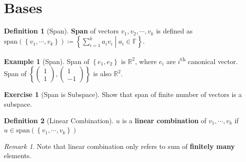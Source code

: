 \documentclass[12pt, a4paper]{article}
\newcommand{\R}{\mathbb{R}}
\newcommand{\spantext}{\text{span}}
\theoremstyle{remark}
\newtheorem{remark}{Remark}
\theoremstyle{definition}
\newtheorem{definition}{Definition}
\newtheorem{example}{Example}
\newtheorem{exercise}{Exercise}
\numberwithin{equation}{section}
\numberwithin{definition}{section}
\numberwithin{example}{section}
\numberwithin{exercise}{section}
\numberwithin{remark}{section}
\numberwithin{figure}{section}
\begin{document}
\section{Bases}
\begin{definition}[Span]
    \textbf{Span} of vectors $v_1, v_2, \cdots, v_k$ is defined as $\spantext \left( \left\{ v_1, \cdots, v_k \right\} \right) \coloneqq  \left\{ \sum_{i=1}^k a_iv_i \middle| a_i \in \mathbb{F} \right\}$.
\end{definition}
\begin{example}[Span]
    Span of $\left\{ e_1, e_2 \right\}$ is $\R^2$, where $e_i$ are $i$\textsuperscript{th} canonical vector.
    Span of $\left\{ 
        \begin{pmatrix}
            1 \\ 1
        \end{pmatrix},
        \begin{pmatrix}
            1 \\ -1
        \end{pmatrix}
    \right\}$ is also $\R^2$.
\end{example}
\begin{exercise}[Span is Subspace]
    Show that span of finite number of vectors is a subspace.
\end{exercise}
\begin{definition}[Linear Combination]
    $u$ is a \textbf{linear combination} of $v_1, \cdots, v_k$ if $u \in \spantext \left( \left\{ v_1, \cdots, v_k \right\} \right)$
\end{definition}
\begin{remark}
    Note that linear combination only refers to sum of \textbf{finitely many} elements.
\end{remark}
\end{document}
